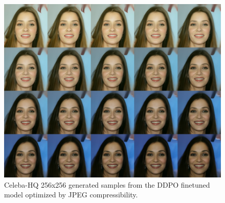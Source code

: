 \begin{appendixs}
        \begin{figure}
            \centering
            \includegraphics[scale=1.40]{img/results/compressibility_44.png}
            \vspace{-0pt}  %
            \captionsetup{width=\textwidth} %
            \caption{Celeba-HQ 256x256 generated samples from the DDPO finetuned model optimized by JPEG compressibility.}
            \label{fig:ddpm-to-ddpo-compressibility-extra2}
        \end{figure}


\end{appendixs}
